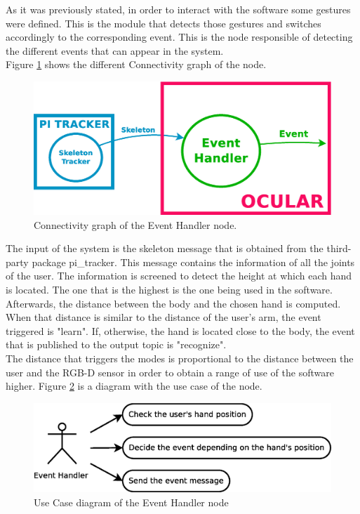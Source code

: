 	As it was previously stated, in order to interact with the software some gestures were defined. This is the module that detects those gestures and switches accordingly to the corresponding event. This is the node responsible of detecting the different events that can appear in the system. 
	\\
	Figure \ref{node_event} shows the different Connectivity graph of the node. 
		\begin{figure}[H]
			\begin{center}
			\includegraphics[width=0.5\linewidth]{img/diagrams/node_event.eps}
			\caption[Event Handler 3D node I/O]{Connectivity graph of the Event Handler node.}		
			\label{node_event}
			\end{center}
		\end{figure}
	The input of the system is the skeleton message that is obtained from the third-party package pi\_tracker. This message contains the information of all the joints of the user. The information is screened to detect the height at which each hand is located. The one that is the highest is the one being used in the software. Afterwards, the distance between the body and the chosen hand is computed. When that distance is similar to the distance of the user's arm, the event triggered is "learn". If, otherwise, the hand is located close to the body, the event that is published to the output topic is "recognize". 
	\\

	The distance that triggers the modes is proportional to the distance between the user and the RGB-D sensor in order to obtain a range of use of the software higher. 
	Figure \ref{uc_event} is a diagram with the use case of the node. 
	\begin{figure}[H]
		\centering
			\includegraphics[scale=0.4]{img/diagrams/uc_event_handler.eps}
			\caption[Use case diagram Event Handler node]{Use Case diagram of the Event Handler node}
		\label{uc_event}
	\end{figure}

